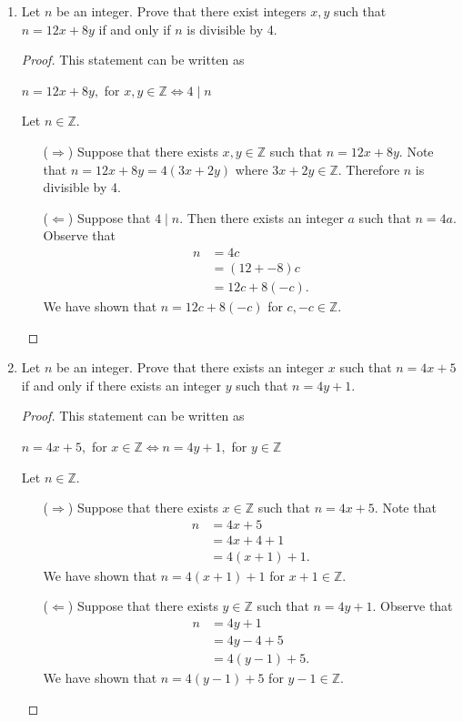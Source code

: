 \documentclass{article}
\theoremstyle{definition}
\begin{document}
    \begin{enumerate}
	\item Let $n$ be an integer. Prove that there exist integers $x, y$ such that $n=12x+8y$ if and only if $n$ is divisible by 4.
	    \begin{proof}
	    This statement can be written as 
		\begin{center}
		$n = 12x+8y,$ for $ x, y\in \mathbb{Z} \iff 4 \mid n$
		\end{center}
	    Let $n\in\mathbb{Z}$.
		\begin{itemize}	
		\item[($\Rightarrow$)] Suppose that there exists $x, y\in \mathbb{Z}$ such that $n = 12x+8y$. Note that $n = 12x+8y = 4(3x+2y)$ where $3x+2y\in \mathbb{Z}$. Therefore $n$ is divisible by 4.
		
    		\item[($\Leftarrow$)] Suppose that $4\mid n$. Then there exists an integer $a$ such that $n=4a$. Observe that 
   		 \begin{align*}
   		 n & = 4 c \\
    		& = (12 + -8) c\\
    		& = 12c + 8 (-c).
    		\end{align*}
    		We have shown that $n = 12c + 8 (-c)$ for $c, -c \in\mathbb{Z}$.
  		\end{itemize}
	     \end{proof}

	\item Let $n$ be an integer. Prove that there exists an integer $x$ such that $n=4x+5$ if and only if there exists an integer $y$ such that $n=4y+1$.
	     \begin{proof}
	     This statement can be written as 
		\begin{center}
		$n = 4x+5,$ for $ x\in \mathbb{Z} \iff n = 4y+1,$ for $ y\in \mathbb{Z}$
		\end{center}
	    Let $n\in\mathbb{Z}$.
		\begin{itemize}	
		\item[($\Rightarrow$)] Suppose that there exists $x\in \mathbb{Z}$ such that $n = 4x+5$. Note that 
		\begin{align*}
		n &= 4x + 5\\
		& = 4x + 4 + 1\\
		& = 4(x+1) +1.
		\end{align*}
		We have shown that $n = 4(x+1) +1$ for $x+1 \in\mathbb{Z}$.
    		\item[($\Leftarrow$)] Suppose that there exists $y\in \mathbb{Z}$ such that $n = 4y+1$. Observe that 
   		 \begin{align*}
   		 n & = 4y + 1 \\
    		& = 4y - 4 + 5\\
    		& = 4 (y-1) + 5.
    		\end{align*}
    		We have shown that $n = 4 (y-1) + 5$ for $y-1 \in\mathbb{Z}$.
  		\end{itemize}
	     \end{proof}
    \end{enumerate}
\end{document}
